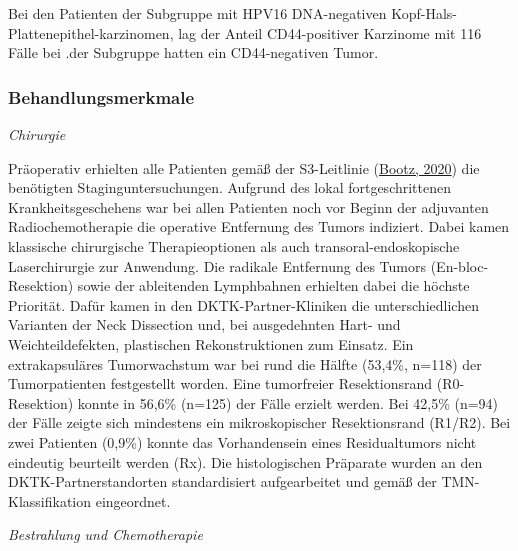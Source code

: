 Bei den Patienten der Subgruppe mit HPV16 DNA-negativen Kopf-Hals-Plattenepithel-karzinomen, lag der Anteil CD44-positiver Karzinome mit 116 Fälle bei .der Subgruppe hatten ein CD44-negativen Tumor.

\hypertarget{behandlungsmerkmale}{%
\subsubsection{Behandlungsmerkmale}\label{behandlungsmerkmale}}

\emph{Chirurgie}

Präoperativ erhielten alle Patienten gemäß der S3-Leitlinie (\href{about:blank\#_ENREF_14}{Bootz, 2020}) die benötigten Staginguntersuchungen. Aufgrund des lokal fortgeschrittenen Krankheitsgeschehens war bei allen Patienten noch vor Beginn der adjuvanten Radiochemotherapie die operative Entfernung des Tumors indiziert. Dabei kamen klassische chirurgische Therapieoptionen als auch transoral-endoskopische Laserchirurgie zur Anwendung. Die radikale Entfernung des Tumors (En-bloc-Resektion) sowie der ableitenden Lymphbahnen erhielten dabei die höchste Priorität. Dafür kamen in den DKTK-Partner-Kliniken die unterschiedlichen Varianten der Neck Dissection und, bei ausgedehnten Hart- und Weichteildefekten, plastischen Rekonstruktionen zum Einsatz. Ein extrakapsuläres Tumorwachstum war bei rund die Hälfte (53,4\%, n=118) der Tumorpatienten festgestellt worden. Eine tumorfreier Resektionsrand (R0- Resektion) konnte in 56,6\% (n=125) der Fälle erzielt werden. Bei 42,5\% (n=94) der Fälle zeigte sich mindestens ein mikroskopischer Resektionsrand (R1/R2). Bei zwei Patienten (0,9\%) konnte das Vorhandensein eines Residualtumors nicht eindeutig beurteilt werden (Rx). Die histologischen Präparate wurden an den DKTK-Partnerstandorten standardisiert aufgearbeitet und gemäß der TMN-Klassifikation eingeordnet.

\emph{Bestrahlung und Chemotherapie}

